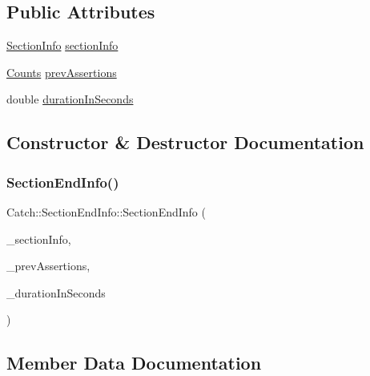 \subsection*{Public Attributes}
\begin{DoxyCompactItemize}
\item 
\hyperlink{struct_catch_1_1_section_info}{Section\+Info} \hyperlink{struct_catch_1_1_section_end_info_a2d44793392cb83735d086d726822abe9}{section\+Info}
\item 
\hyperlink{struct_catch_1_1_counts}{Counts} \hyperlink{struct_catch_1_1_section_end_info_ae70b154cbc05b5dd2901d97f89303d8c}{prev\+Assertions}
\item 
double \hyperlink{struct_catch_1_1_section_end_info_a7c262f2dab9cff166b8eca620c47eea5}{duration\+In\+Seconds}
\end{DoxyCompactItemize}


\subsection{Constructor \& Destructor Documentation}
\mbox{\label{struct_catch_1_1_section_end_info_abc9381c7c22b6907317ec985ccaa6713}} 
\subsubsection{\texorpdfstring{Section\+End\+Info()}{SectionEndInfo()}}
{\footnotesize\ttfamily Catch\+::\+Section\+End\+Info\+::\+Section\+End\+Info (\begin{DoxyParamCaption}\item[{\hyperlink{struct_catch_1_1_section_info}{Section\+Info} const \&}]{\+\_\+section\+Info,  }\item[{\hyperlink{struct_catch_1_1_counts}{Counts} const \&}]{\+\_\+prev\+Assertions,  }\item[{double}]{\+\_\+duration\+In\+Seconds }\end{DoxyParamCaption})\hspace{0.3cm}{\ttfamily [inline]}}



\subsection{Member Data Documentation}
\mbox{\label{struct_catch_1_1_section_end_info_a7c262f2dab9cff166b8eca620c47eea5}} 
